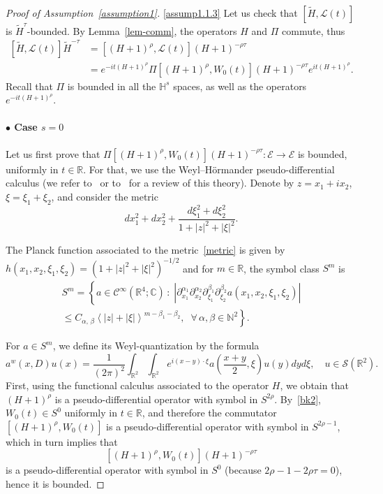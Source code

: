 \documentclass[10pt]{amsart}
\theoremstyle{definition}\newtheorem{defi}[theo]{Definition}\newtheorem{rema}[theo]{Remark}\newtheorem{exam}[theo]{Example}\newtheorem{exem}[theo]{Example}\newtheorem{nota}[theo]{Notation}
\newcommand{\C}{\mathbb{C}}
\newcommand{\R}{\mathbb{R}}
\newcommand{\HH}{\mathbb{H}}
\newcommand{\N}{\mathbb{N}}
\newcommand{\E}{\mathcal{E}}
\newcommand{\clC}{\mathcal{C}}
\renewcommand{\L}{\mathscr{L}}
\newcommand{\crS}{\mathscr{S}}
\newcommand{\wt}{\widetilde}
\newcommand{\<}{\langle}
\renewcommand{\>}{\rangle}
\let\oldforall\forall
\renewcommand*{\forall}{\mathrel{\oldforall}}
\begin{document}
\begin{proof}[{Proof of Assumption~\ref{assumption1}}]
\eqref{assump1.1.3} Let us check that $ [\wt{H}, \L(t)]$ is $\wt{H}^{\tau}$-bounded. By Lemma~\ref{lem-comm}, the operators $H$ and $\Pi$ commute, thus
\begin{align*}
\left[\wt{H}, \L(t)\right]\wt{H}^{-\tau}&=\left[(H+1)^{\rho}, \L(t)\right](H+1)^{-\rho \tau}\\
&= e^{-it (H+1)^{\rho}}\Pi\left[(H+1)^{\rho}, W_0(t)\right](H+1)^{-\rho \tau}e^{it (H+1)^{\rho}}.
\end{align*}
Recall that $\Pi$ is bounded in all the $\HH^s$ spaces, as well as the operators $e^{-it (H+1)^{\rho}}$.


\paragraph{$\bullet$ Case $s=0$}
Let us first prove that $\Pi[(H+1)^{\rho}, W_0(t)](H+1)^{-\rho \tau} : \E \longrightarrow \E$ is bounded, uniformly in $t\in \R$. For that, we use the Weyl--H\"ormander pseudo-differential calculus (we refer to~\cite{Helffer,Robert} or to~\cite[Chapter~3]{Parmeggiani} for a review of this theory). Denote by $ z=x_1+ix_2$, $\xi=\xi_1+\xi_2$, and consider the metric
\begin{equation}\label{metric}
dx_1^2+dx_2^2+\frac{d\xi_1^2+d\xi_2^2}{1+|z|^2+|\xi|^2}.
\end{equation}

The Planck function associated to the metric~\eqref{metric} is given by $h(x_1,x_2,\xi_1,\xi_2)=(1+|z|^2+|\xi|^2)^{-1/2}$ and for $m \in \R$, the symbol class $S^m$ is
\begin{multline*}
S^m =\left\{ a \in \clC^\infty\left(\R^4; \C\right)\,: \; \left|\partial_{x_1}^{\alpha_1} \partial_{x_2}^{\alpha_2} \partial_{\xi_1}^{\beta_1}\partial_{\xi_2}^{\beta_2} a(x_1,x_2,\xi_1,\xi_2)\right|\right. \\
\left. \leq C_{\alpha,\,\beta}\left\langle |z|+|\xi|\right\rangle^{m-\beta_1-\beta_2}, \;\; \forall \, \alpha, \beta \in \N^2\right\}.
\end{multline*}

For $a \in S^m$, we define its Weyl-quantization by the formula
\[
a^w(x,D)u(x)=\frac1{(2\pi)^2}\int_{\R^2}\int_{\R^2} e^{i(x-y)\cdot \xi}a\left(\frac{x+y}2,\xi\right) u(y)dyd \xi, \quad u\in \crS\left(\R^2\right).
\]
First, using the functional calculus associated to the operator $H$, we obtain that $(H+1)^\rho$ is a pseudo-differential operator with symbol in $S^{2\rho}$. By~\eqref{bk2}, $W_0(t)\in S^0$ uniformly in $t\in \R$, and therefore the commutator $[(H+1)^{\rho}, W_0(t)]$ is a pseudo-differential operator with symbol in $S^{2\rho-1}$, which in turn implies that
\[
\left[(H+1)^{\rho}, W_0(t)\right](H+1)^{-\rho \tau}
\]
is a pseudo-differential operator with symbol in $S^{0}$ (because $2\rho-1-2\rho \tau=0$), hence it is bounded.


\end{proof}
\end{document}
